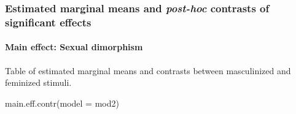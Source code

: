 \documentclass[
  bookmarksnumbered]{article}
\newenvironment{Shaded}{\begin{snugshade}}{\end{snugshade}}
\newcommand{\AttributeTok}[1]{\textcolor[rgb]{0.80,0.80,0.80}{#1}}
\newcommand{\FunctionTok}[1]{\textcolor[rgb]{0.94,0.94,0.56}{#1}}
\newcommand{\NormalTok}[1]{\textcolor[rgb]{0.80,0.80,0.80}{#1}}
\begin{document}
\begin{table}[H]
\centering
\caption{\label{tab:tab-mod2}ANOVA-type table of fixed effects for the TFD model}
\centering
{}
\end{table}

\subsubsection{\texorpdfstring{Estimated marginal means and \emph{post-hoc} contrasts of significant effects}{Estimated marginal means and post-hoc contrasts of significant effects}}\label{estimated-marginal-means-and-post-hoc-contrasts-of-significant-effects-1}

\paragraph{Main effect: Sexual dimorphism}\label{main-effect-sexual-dimorphism-1}

Table of estimated marginal means and contrasts between masculinized and feminized stimuli.

\begin{Shaded}
\begin{Highlighting}[]
\FunctionTok{main.eff.contr}\NormalTok{(}\AttributeTok{model =}\NormalTok{ mod2)}
\end{Highlighting}
\end{Shaded}
\end{document}

